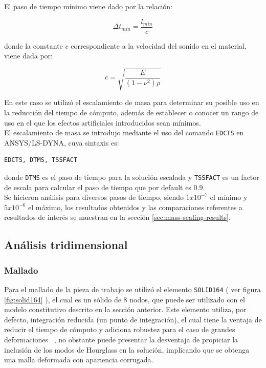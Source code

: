 El paso de tiempo mínimo viene dado por la relación:

\begin{equation}
\Delta t_{min} = \frac{l_{min}}{c} 
\end{equation}

donde la constante $c$ correspondiente a la velocidad del sonido en el material, viene dada por:

\begin{equation}
c = \sqrt{\frac{E}{(1-\nu^2)\rho}}
\end{equation}

En este caso se utilizó el escalamiento de masa para determinar su posible uso en la 
reducción del tiempo de cómputo, además de establecer o conocer un rango de uso en el que los 
efectos artificiales introducidos sean mínimos.\\

El escalamiento de masa se introdujo mediante el uso del comando \texttt{EDCTS} en ANSYS/LS-DYNA\CR,
cuya sintaxis es:

\begin{verbatim}
EDCTS, DTMS, TSSFACT
\end{verbatim}

donde \texttt{DTMS} es el paso de tiempo para la solución escalada y \texttt{TSSFACT} es un factor 
de escala para calcular el paso de tiempo que por default es 0.9.\\

Se hicieron análisis para diversos pasos de tiempo, siendo $1x10^{-7}$ el mínimo y $5x10^{-6}$ el 
máximo, los resultados obtenidos y las comparaciones referentes a resultados de interés se muestran 
en la sección \ref{sec:mass-scaling-results}.


\subsection{Análisis tridimensional}

\subsubsection{Mallado}

Para el mallado de la pieza de trabajo se utilizó el elemento \texttt{SOLID164} 
( ver figura \ref{fig:solid164} ), el cual es un sólido de 8 nodos, que puede ser utilizado con el modelo 
constitutivo descrito en la sección anterior. Este elemento utiliza, por defecto, integración reducida 
(un punto de integración), el cual tiene la ventaja de reducir el tiempo de cómputo y adiciona 
robustez para el caso de grandes deformaciones ~\cite{lsdyna-ansys-manual}, no obstante puede presentar 
la desventaja de propiciar la inclusión de los modos de Hourglass en la solución, implicando que 
se obtenga una malla deformada con apariencia corrugada.

